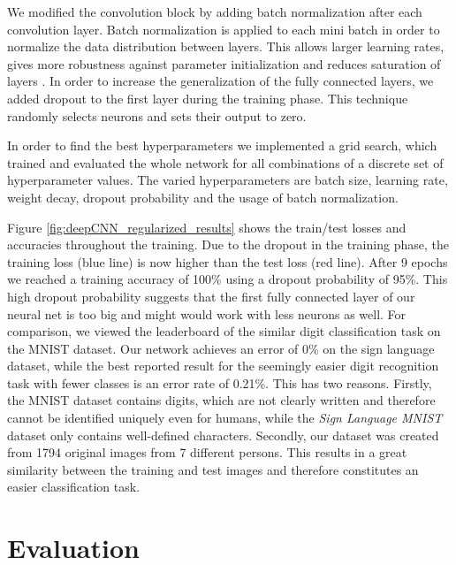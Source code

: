 \documentclass[a4paper]{article}
\begin{document}
We modified the convolution block by adding batch normalization \cite{ioffe2015batch} after each convolution layer. Batch normalization is applied to each mini batch in order to normalize the data distribution between layers. This allows larger learning rates, gives more robustness against parameter initialization and reduces saturation of layers \cite{ioffe2015batch}. In order to increase the generalization of the fully connected layers, we added dropout to the first layer during the training phase. This technique randomly selects neurons and sets their output to zero. 

In order to find the best hyperparameters we implemented a grid search, which trained and evaluated the whole network for all combinations of a discrete set of hyperparameter values. The varied hyperparameters are batch size, learning rate, weight decay, dropout probability and the usage of batch normalization.

Figure \ref{fig:deepCNN_regularized_results} shows the train/test losses and accuracies throughout the training. Due to the dropout in the training phase, the training loss (blue line) is now higher than the test loss (red line). After 9 epochs we reached a training accuracy of 100\% using a dropout probability of 95\%. This high dropout probability suggests that the first fully connected layer of our neural net is too big and might would work with less neurons as well. For comparison, we viewed the leaderboard of the similar digit classification task on the MNIST dataset. Our network achieves an error of 0\% on the sign language dataset, while the best reported result for the seemingly easier digit recognition task with fewer classes is an error rate of 0.21\%. This has two reasons. Firstly, the MNIST dataset contains digits, which are not clearly written and therefore cannot be identified uniquely even for humans, while the \textit{Sign Language MNIST} dataset only contains well-defined characters. Secondly, our dataset was created from 1794 original images from 7 different persons. This results in a great similarity between the training and test images and therefore constitutes an easier classification task.

\section{Evaluation}
\label{ch:evaluation}
\end{document}
